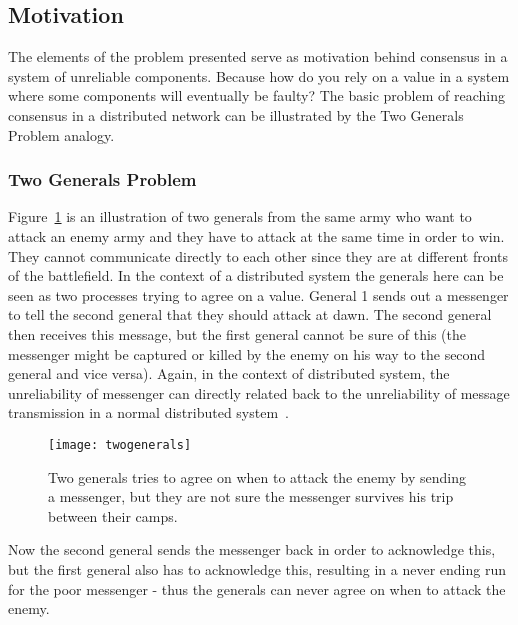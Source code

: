 

\subsection{Motivation} %
\label{sub:motivation}

The elements of the problem presented serve as motivation behind consensus in a system of unreliable components. Because how do you rely on a value in a system where some components will eventually be faulty? The basic problem of reaching consensus in a distributed network can be illustrated by the Two Generals Problem analogy.

\subsubsection{Two Generals Problem} %
\label{ssub:two_generals_problem}

Figure~\ref{generals} is an illustration of two generals from the same army who want to attack an enemy army and they have to attack at the same time in order to win. They cannot communicate directly to each other since they are at different fronts of the battlefield. In the context of a distributed system the generals here can be seen as two processes trying to agree on a value.
General 1 sends out a messenger to tell the second general that they should attack at dawn. The second general then receives this message, but the first general cannot be sure of this (the messenger might be captured or killed by the enemy on his way to the second general and vice versa). Again, in the context of distributed system, the unreliability of messenger can directly related back to the unreliability of message transmission in a normal distributed system~\cite{Byzantine}.

\begin{figure}[h]
	\centering
	\texttt{[image: twogenerals]}
	\caption{Two generals tries to agree on when to attack the enemy by sending a messenger, but they are not sure the messenger survives his trip between their camps.}
	\label{generals}
\end{figure}

Now the second general sends the messenger back in order to acknowledge this, but the first general also has to acknowledge this, resulting in a never ending run for the poor messenger - thus the generals can never agree on when to attack the enemy.

